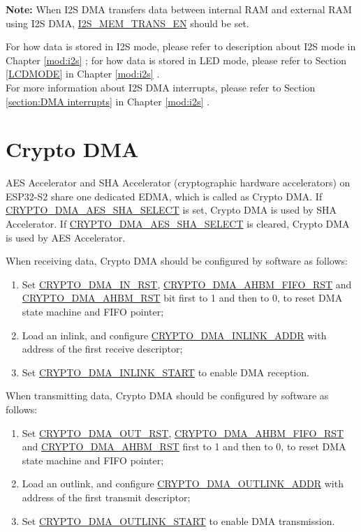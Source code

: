 \documentclass[main\_\_EN.tex]{subfiles}
\begin{document}
{\bfseries Note:} When I2S DMA transfers data between internal RAM and external RAM using I2S DMA, \hyperref[fielddesc:I2SMEMTRANSEN]{I2S\_MEM\_TRANS\_EN} should be set.

For how data is stored in I2S mode, please refer to description about I2S mode in Chapter \ref{mod:i2s} \textit{}; for how data is stored in LED mode, please refer to Section \ref{LCDMODE} \textit{} in Chapter  \ref{mod:i2s} \textit{}.\\ For more information about I2S DMA interrupts, please refer to Section \ref{section:DMA interrupts} \textit{} in Chapter \ref{mod:i2s} \textit{}.

\section{Crypto DMA}\label{subsection:dma-crypto}
AES Accelerator and SHA Accelerator (cryptographic hardware accelerators) on ESP32-S2 share one dedicated EDMA, which is called as Crypto DMA. If \hyperref[fielddesc:CRYPTODMAAESSHASELECT]{CRYPTO\_DMA\_AES\_SHA\_SELECT} is set, Crypto DMA is used by SHA Accelerator. If \hyperref[fielddesc:CRYPTODMAAESSHASELECT]{CRYPTO\_DMA\_AES\_SHA\_SELECT} is cleared, Crypto DMA is used by AES Accelerator.

When receiving data, Crypto DMA should be configured by software as follows:
\begin{enumerate}
    \item Set \hyperref[fielddesc:CRYPTODMAINRST]{CRYPTO\_DMA\_IN\_RST}, \hyperref[fielddesc:CRYPTODMAAHBMFIFORST]{CRYPTO\_DMA\_AHBM\_FIFO\_RST} and \hyperref[fielddesc:CRYPTODMAAHBMRST]{CRYPTO\_DMA\_AHBM\_RST} bit first to 1 and then to 0, to reset DMA state machine and FIFO pointer;
    \item Load an inlink, and configure \hyperref[fielddesc:CRYPTODMAINLINKADDR]{CRYPTO\_DMA\_INLINK\_ADDR} with address of the first receive descriptor;
    \item Set \hyperref[fielddesc:CRYPTODMAINLINKSTART]{CRYPTO\_DMA\_INLINK\_START} to enable DMA reception.
\end{enumerate}

When transmitting data, Crypto DMA should be configured by software as follows:
\begin{enumerate}
    \item Set \hyperref[fielddesc:CRYPTODMAOUTRST]{CRYPTO\_DMA\_OUT\_RST}, \hyperref[fielddesc:CRYPTODMAAHBMFIFORST]{CRYPTO\_DMA\_AHBM\_FIFO\_RST} and \hyperref[fielddesc:CRYPTODMAAHBMRST]{CRYPTO\_DMA\_AHBM\_RST} first to 1 and then to 0, to reset DMA state machine and FIFO pointer;
    \item Load an outlink, and configure \hyperref[fielddesc:CRYPTODMAOUTLINKADDR]{CRYPTO\_DMA\_OUTLINK\_ADDR} with address of the first transmit descriptor;
    \item Set \hyperref[fielddesc:CRYPTODMAOUTLINKSTART]{CRYPTO\_DMA\_OUTLINK\_START} to enable DMA transmission.
\end{enumerate}
\end{document}
